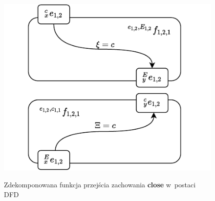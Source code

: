 \begin{figure}
    \centering
    \includegraphics[width=\columnwidth]{figures/ISR-ve-gripper-fp-close.pdf}
    \label{fig:ve-gripper-fp-close}
    \caption{Zdekomponowana funkcja przejścia zachowania \textbf{close} w~postaci DFD}
\end{figure}